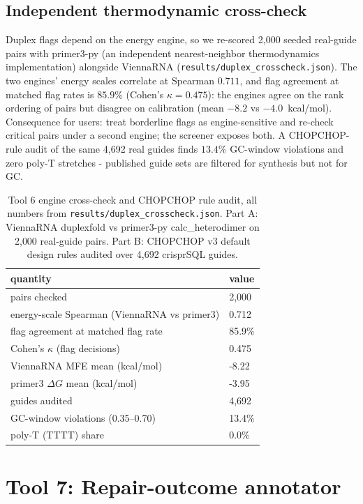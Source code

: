 \documentclass[12pt]{article}
\begin{document}
\subsection{Independent thermodynamic cross-check}
Duplex flags depend on the energy engine, so we re-scored 2{,}000 seeded
real-guide pairs with primer3-py (an independent nearest-neighbor
thermodynamics implementation) alongside ViennaRNA
(\texttt{results/duplex\_crosscheck.json}). The two engines' energy
scales correlate at Spearman $0.711$, and flag agreement at matched flag
rates is $85.9\%$ (Cohen's $\kappa = 0.475$): the engines agree on the
rank ordering of pairs but disagree on calibration (mean $-8.2$ vs
$-4.0$~kcal/mol). Consequence for users: treat borderline flags as
engine-sensitive and re-check critical pairs under a second engine; the
screener exposes both. A CHOPCHOP-rule audit of the same 4{,}692 real
guides finds $13.4\%$ GC-window violations and zero poly-T stretches -
published guide sets are filtered for synthesis but not for GC.


\begin{table}[t]
\centering\small
\caption{Tool 6 engine cross-check and CHOPCHOP rule audit, all numbers from \texttt{results/duplex\_crosscheck.json}. Part A: ViennaRNA duplexfold vs primer3-py calc\_heterodimer on 2{,}000 real-guide pairs. Part B: CHOPCHOP v3 default design rules audited over 4{,}692 crisprSQL guides.}
\label{tab:crosscheck}
\begin{tabular}{ll}
\hline
quantity & value \\
\hline
pairs checked & 2{,}000 \\
energy-scale Spearman (ViennaRNA vs primer3) & 0.712 \\
flag agreement at matched flag rate & 85.9\% \\
Cohen's $\kappa$ (flag decisions) & 0.475 \\
ViennaRNA MFE mean (kcal/mol) & -8.22 \\
primer3 $\Delta G$ mean (kcal/mol) & -3.95 \\
\hline
guides audited & 4{,}692 \\
GC-window violations (0.35--0.70) & 13.4\% \\
poly-T (TTTT) share & 0.0\% \\
\hline
\end{tabular}
\end{table}
\section{Tool 7: Repair-outcome annotator}
\end{document}
